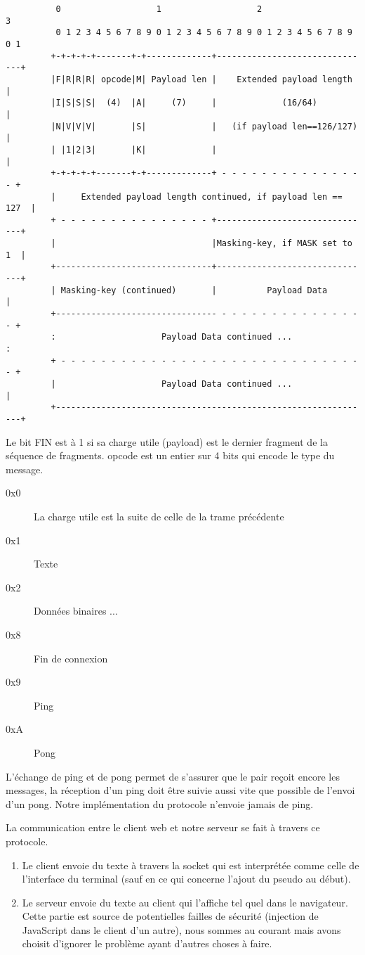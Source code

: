 \documentclass[a4paper,10pt]{article} %
\begin{document}
\begin{verbatim}
          0                   1                   2                   3
          0 1 2 3 4 5 6 7 8 9 0 1 2 3 4 5 6 7 8 9 0 1 2 3 4 5 6 7 8 9 0 1
         +-+-+-+-+-------+-+-------------+-------------------------------+
         |F|R|R|R| opcode|M| Payload len |    Extended payload length    |
         |I|S|S|S|  (4)  |A|     (7)     |             (16/64)           |
         |N|V|V|V|       |S|             |   (if payload len==126/127)   |
         | |1|2|3|       |K|             |                               |
         +-+-+-+-+-------+-+-------------+ - - - - - - - - - - - - - - - +
         |     Extended payload length continued, if payload len == 127  |
         + - - - - - - - - - - - - - - - +-------------------------------+
         |                               |Masking-key, if MASK set to 1  |
         +-------------------------------+-------------------------------+
         | Masking-key (continued)       |          Payload Data         |
         +-------------------------------- - - - - - - - - - - - - - - - +
         :                     Payload Data continued ...                :
         + - - - - - - - - - - - - - - - - - - - - - - - - - - - - - - - +
         |                     Payload Data continued ...                |
         +---------------------------------------------------------------+
\end{verbatim}

Le bit \textrm{FIN} est à 1 si sa charge utile (payload) est le dernier fragment de la séquence de fragments. \textrm{opcode} est un entier sur 4 bits qui encode le type du message.

\begin{description}
\item[0x0] La charge utile est la suite de celle de la trame précédente
\item[0x1] Texte
\item[0x2] Données binaires
  ...
\item[0x8] Fin de connexion
\item[0x9] Ping
\item[0xA] Pong
\end{description}

L'échange de ping et de pong permet de s'assurer que le pair reçoit encore les messages, la réception d'un ping doit être suivie aussi vite que possible de l'envoi d'un pong. Notre implémentation du protocole n'envoie jamais de ping.

La communication entre le client web et notre serveur se fait à travers ce protocole.
\begin{enumerate}
\item Le client envoie du texte à travers la socket qui est interprétée comme celle de l'interface du terminal (sauf en ce qui concerne l'ajout du pseudo au début).
\item Le serveur envoie du texte au client qui l'affiche tel quel dans le navigateur. Cette partie est source de potentielles failles de sécurité (injection de JavaScript dans le client d'un autre), nous sommes au courant mais avons choisit d'ignorer le problème ayant d'autres choses à faire.
\end{enumerate}
\end{document}
